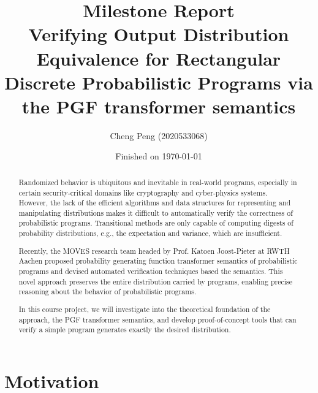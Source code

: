 \documentclass[a4paper]{article}
\title{Milestone Report\\
	\small Verifying Output Distribution Equivalence for Rectangular Discrete Probabilistic Programs via the PGF transformer semantics
}
\date{Finished on \today}
\author{Cheng Peng (2020533068)}
\begin{document}
\maketitle


\begin{abstract}
	Randomized behavior is ubiquitous and inevitable in real-world programs, especially in certain security-critical domains like cryptography and cyber-physics systems.
	However, the lack of the efficient algorithms and data structures for representing and manipulating distributions makes it difficult to automatically verify the correctness of probabilistic programs.
	Transitional methods are only capable of computing digests of probability distributions, e.g., the expectation and variance, which are insufficient.\par
	Recently, the MOVES research team headed by Prof. Katoen Joost-Pieter at RWTH Aachen proposed probability generating function transformer semantics of probabilistic programs and devised automated verification techniques based the semantics.
	This novel approach preserves the entire distribution carried by programs, enabling precise reasoning about the behavior of probabilistic programs.\par
	In this course project, we will investigate into the theoretical foundation of the approach, the PGF transformer semantics, and develop proof-of-concept tools that can verify a simple program generates exactly the desired distribution.
\end{abstract}

\pagebreak

\section{Motivation}
\end{document}
